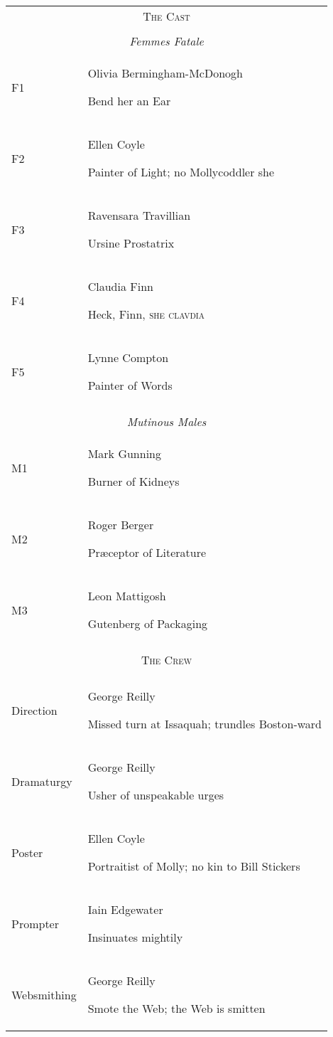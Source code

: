 \begin{tabular}{lp{10cm}}
    \multicolumn{2}{c}{\Large \textsc{The Cast}} \\
\\
    \multicolumn{2}{c}{\large \textit{Femmes Fatale}} \\
F1 & Olivia Bermingham-McDonogh \par
     \footnotesize Bend her an Ear \\
F2 & Ellen Coyle \par
     \footnotesize Painter of Light; no Mollycoddler she \\
F3 & Ravensara Travillian \par
     \footnotesize Ursine Prostatrix \\
F4 & Claudia Finn \par
     \footnotesize Heck, Finn, \textsc{she clavdia} \\
F5 & Lynne Compton \par
     \footnotesize Painter of Words \\
\\
    \multicolumn{2}{c}{\large \textit{Mutinous Males}} \\
M1 & Mark Gunning \par
     \footnotesize Burner of Kidneys \\
M2 & Roger Berger \par
     \footnotesize Præceptor of Literature \\
M3 & Leon Mattigosh \par
     \footnotesize Gutenberg of Packaging \\
\\
    \multicolumn{2}{c}{\Large \textsc{The Crew}} \\
\\
Direction & George Reilly \par
     \footnotesize Missed turn at Issaquah; trundles Boston-ward \\
Dramaturgy & George Reilly \par
     \footnotesize Usher of unspeakable urges \\
Poster & Ellen Coyle \par
     \footnotesize Portraitist of Molly; no kin to Bill Stickers \\
Prompter & Iain Edgewater \par
     \footnotesize Insinuates mightily \\
Websmithing & George Reilly \par
     \footnotesize Smote the Web; the Web is smitten \\

\end{tabular}
